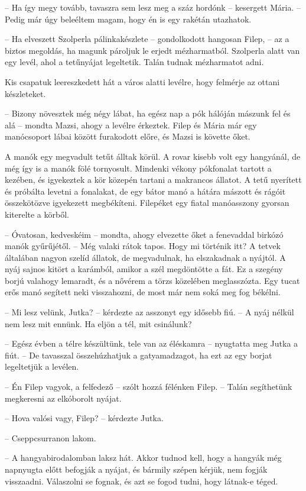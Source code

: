 \documentclass[10pt]{memoir}
\begin{document}
-- Ha így megy tovább, tavaszra sem lesz meg a száz hordónk -- kesergett
Mária. -- Pedig már úgy beleéltem magam, hogy én is egy rakétán utazhatok.

-- Ha elveszett Szolperla pálinkakészlete -- gondolkodott hangosan Filep, --
az a biztos megoldás, ha magunk pároljuk le erjedt mézharmatból. Szolperla
alatt van egy levél, ahol a tetűnyájat legeltetik. Talán tudnak mézharmatot
adni.

Kis csapatuk leereszkedett hát a város alatti levélre, hogy felmérje az ottani
készleteket.

-- Bizony növesztek még négy lábat, ha egész nap a pók hálóján mászunk fel és
alá -- mondta Mazsi, ahogy a levélre érkeztek. Filep és Mária már egy
manócsoport lábai között furakodott előre, és Mazsi is követte őket.

A manók egy megvadult tetűt álltak körül. A rovar kisebb volt egy hangyánál, de
még így is a manók fölé tornyosult. Mindenki vékony pókfonalat tartott a
kezében, és igyekeztek a kör közepén tartani a makrancos állatot. A tetű
nyerített és próbálta levetni a fonalakat, de egy bátor manó a hátára mászott
és rágóit összekötözve igyekezett megbékíteni. Filepéket egy fiatal manóasszony
gyorsan kiterelte a körből.

-- Óvatosan, kedveskéim -- mondta, ahogy elvezette őket a fenevaddal birkózó
manók gyűrűjétől. -- Még valaki rátok tapos. Hogy mi történik itt? A tetvek
általában nagyon szelíd állatok, de megvadulnak, ha elszakadnak a nyájtól. A
nyáj sajnos kitört a karámból, amikor a szél megdöntötte a fát. Ez a szegény
borjú valahogy lemaradt, és a nővérem a törzs közelében meglasszózta. Egy tucat
erős manó segített neki visszahozni, de most már nem soká meg fog békélni. 

-- Mi lesz velünk, Jutka? -- kérdezte az asszonyt egy idősebb fiú. -- A nyáj
nélkül nem lesz mit ennünk. Ha eljön a tél, mit csinálunk?

-- Egész évben a télre készültünk, tele van az éléskamra -- nyugtatta meg
Jutka a fiút. -- De tavasszal összehúzhatjuk a gatyamadzagot, ha ezt az egy
borjat legeltetjük a levélen.

-- Én Filep vagyok, a felfedező -- szólt hozzá félénken Filep. -- Talán
segíthetünk megkeresni az elkóborolt nyájat.

-- Hova valósi vagy, Filep? -- kérdezte Jutka.

-- Cseppcsurranon lakom.

-- A hangyabirodalomban laksz hát. Akkor tudnod kell, hogy a hangyák még
napnyugta előtt befogják a nyájat, és bármily szépen kérjük, nem fogják
visszaadni. Válaszolni se fognak, és azt se fogod tudni, hogy látnak-e téged.
\end{document}
